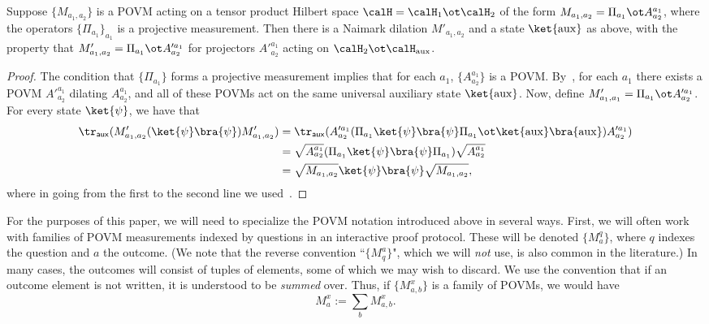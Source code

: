 \documentclass[11pt]{article}
\newcommand{\rmaux}{\mathrm{aux}}
\newcommand{\reg}[1]{{\mathsf{#1}}}
\begin{document}
  \begin{theorem}\label{thm:partial-naimark}
    Suppose $\{M_{a_1, a_2}\}$ is a POVM acting on a tensor product
  Hilbert space $\calH = \calH_1 \ot \calH_2$ of the form $M_{a_1,
    a_2} = \Pi_{a_1} \ot A^{a_1}_{a_2}$, where the operators $\{\Pi_{a_1}\}_{a_1}$ is a
  projective measurement. Then there is a Naimark dilation $M'_{a_1,
    a_2}$ and a state $\ket{\rmaux}$ as above, with the property that
  $M'_{a_1, a_2} = \Pi_{a_1} \ot A'^{a_1}_{a_2}$ for projectors
  $A'^{a_1}_{a_2}$ acting on $\calH_2 \ot \calH_{\rmaux}$.
\end{theorem}
\begin{proof}
  The condition that $\{\Pi_{a_1}\}$ forms a projective measurement
  implies that for each $a_1$, $\{A^{a_1}_{a_2}\}$ is a
  POVM. By~, for each $a_1$ there exists a POVM
  $A'^{a_1}_{a_2}$ dilating $A^{a_1}_{a_2}$, and all of these POVMs
  act on the same universal auxiliary state $\ket{\rmaux}$. Now,
  define $M'_{a_1, a_1} = \Pi_{a_1} \ot A'^{a_1}_{a_2}$. For every
  state $\ket{\psi}$, we have that
  \begin{align*}
    \tr_{\reg{aux}}(M'_{a_1, a_2} (\ket{\psi}\bra{\psi}) M'_{a_1,
    a_2}) &= \tr_{\reg{aux}}( A'^{a_1}_{a_2} (\Pi_{a_1} \ket{\psi}
            \bra{\psi} \Pi_{a_1} \ot \ket{\rmaux} \bra{\rmaux}) A'^{a_1}_{a_2}) \\
          &= \sqrt{A^{a_1}_{a_2}} (\Pi_{a_1} \ket{\psi} \bra{\psi}
            \Pi_{a_1}) \sqrt{A^{a_1}_{a_2}} \\
          &= \sqrt{M_{a_1, a_2}} \ket{\psi} \bra{\psi} \sqrt{M_{a_1,
            a_2}},
  \end{align*}
  where in going from the first to the second line we used~.
\end{proof}


For the purposes of this paper, we will need to specialize the POVM
notation introduced above in several ways. First, we will often work
with families of POVM measurements indexed by questions in an
interactive proof protocol. These will be denoted $\{M^q_a\}$, where
$q$ indexes the question and $a$ the outcome.
(We note that the reverse convention ``$\{M_q^a\}$", which we will \emph{not} use, is also common in the literature.)
In many cases, the outcomes will consist of
tuples of elements, some of which we may wish to discard. We use the
convention that if an outcome element is not written, it
is understood to be \emph{summed} over. Thus, if $\{M^{x}_{a,b}\}$
is a family of POVMs, we would have
\begin{equation}\label{eq:spider-man}
M^{x}_{a} := \sum_b M^{x}_{a,b}.
\end{equation}
\end{document}
